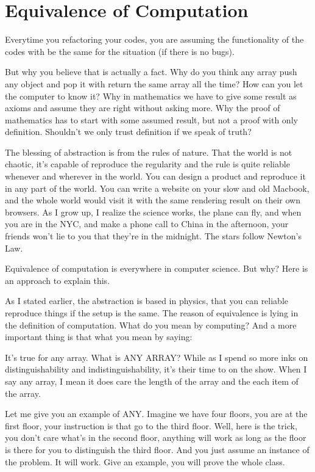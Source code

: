 \section{Equivalence of Computation}

Everytime you refactoring your codes, you are assuming the functionality of the codes with be the same for the situation (if there is no bugs).

But why you believe that is actually a fact. Why do you think any array push any object and pop it with return the same array all the time? How can you let the computer to know it? Why in mathematics we have to give some result as axioms and assume they are right without asking more. Why the proof of mathematics has to start with some assumed result, but not a proof with only definition. Shouldn't we only trust definition if we speak of truth?

The blessing of abstraction is from the rules of nature. That the world is not chaotic, it's capable of reproduce the regularity and the rule is quite reliable whenever and wherever in the world. You can design a product and reproduce it in any part of the world. You can write a website on your slow and old Macbook, and the whole world would visit it with the same rendering result on their own browsers. As I grow up, I realize the science works, the plane can fly, and when you are in the NYC, and make a phone call to China in the afternoon, your friends won't lie to you that they're in the midnight. The stars follow Newton's Law.

Equivalence of computation is everywhere in computer science. But why? Here is an approach to explain this.

As I stated earlier, the abstraction is based in physics, that you can reliable reproduce things if the setup is the same. The reason of equivalence is lying in the definition of computation. What do you mean by computing? And a more important thing is that what you mean by saying:

It's true for any array. What is ANY ARRAY? While as I spend so more inks on distinguishability and indistinguishability, it's their time to on the show. When I say any array, I mean it does care the length of the array and the each item of the array.

Let me give you an example of ANY. Imagine we have four floors, you are at the first floor, your instruction is that go to the third floor. Well, here is the trick, you don't care what's in the second floor, anything will work as long as the floor is there for you to distinguish the third floor. And you just assume an instance of the problem. It will work. Give an example, you will prove the whole class.

